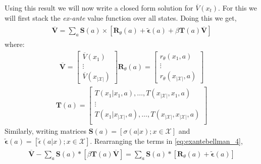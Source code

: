 \documentclass{article}
\begin{document}
Using this result we will now write a closed form solution for $\overline{V}(x_t)$. For this we will first stack the \emph{ex-ante} value function over all states. Doing this we get,
\begin{align} \label{eq:exantebellman_4}
    \begin{split}
    \overline{\mathbf{V}}=\sum_{a}\mathbf{S}(a) \times \left[\mathbf{R}_{\theta}(a)+\tilde{\bm{\epsilon}}(a)+\beta \mathbf{T}(a) \overline{\mathbf{V}}\right]
    \end{split}
\end{align}
where:
\begin{align}
\overline{\mathbf{V}}=\left[\begin{array}{c}\overline{V}(x_1)\\\vdots\\\overline{V}(x_{|\mathcal{X}|})\end{array}\right]
\mathbf{R}_{\theta}(a)=\left[\begin{array}{c}r_{\theta}(x_1,a)\\\vdots\\ r_{\theta}(x_{|\mathcal{X}|},a)\end{array}\right]
\end{align}
\begin{align}
\mathbf{T}(a)=\left[\begin{array}{ccc}
T(x_1|x_1,a),\dots,T(x_{|\mathcal{X}|},x_1,a)\\
\vdots\\
T(x_1|x_{|\mathcal{X}|},a),\dots,T(x_{|\mathcal{X}|},x_{|\mathcal{X}|},a)\\
\end{array}\right]
\end{align}
Similarly, writing matrices $\mathbf{S}(a) = [\sigma(a|x); x\in\mathcal{X}]$ and $\tilde{\bm{\epsilon}}(a)=[\tilde{\epsilon}(a|x); x\in\mathcal{X}]$.
Rearranging the terms in \eqref{eq:exantebellman_4},
\begin{align}
    \begin{split}
    \overline{\mathbf{V}}-\sum_{a}\mathbf{S}(a) *\left[ \beta \mathbf{T}(a) \overline{\mathbf{V}}\right]=\sum_{a}\mathbf{S}(a) *\left[ \mathbf{R}_{\theta}(a)+\tilde{\bm{\epsilon}}(a)\right]
    \end{split}
\end{align}
\end{document}
